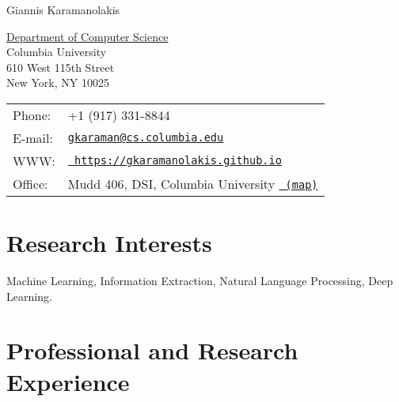 \documentclass[letterpaper]{article}
\def\name{Giannis Karamanolakis}
\renewenvironment{itemize}{
  \begin{list}{}{
    \setlength{\leftmargin}{1.5em}
  }
}{
  \end{list}
}
\begin{document}



{\huge \name}


\vspace{0.25in}

\begin{minipage}{0.45\linewidth}
  \href{http://www.cs.columbia.edu/}{Department of Computer Science} \\
  Columbia University \\
  610 West 115th Street\\
  New York, NY 10025
\end{minipage}
\begin{minipage}{0.45\linewidth}
  \begin{tabular}{ll}
    Phone: & +1 (917) 331-8844 \\
    E-mail: & \href{mailto:gkaraman@cs.columbia.edu}{\tt gkaraman@cs.columbia.edu} \\
    WWW: & \href{https://gkaramanolakis.github.io}{\tt
    https://gkaramanolakis.github.io} \\
    Office: & Mudd 406, DSI, Columbia University \href{https://goo.gl/maps/CsUb6tbN69L2}{\tt
    (map)}
  \end{tabular}
\end{minipage}


\section*{Research Interests}
\begin{itemize}
  \item Machine Learning, Information Extraction, Natural Language Processing, Deep Learning. %
\end{itemize}


\section*{Professional and Research Experience}
\end{document}
